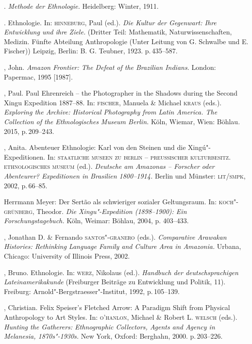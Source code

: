 \begin{bibliohedra}
 \titidem. \textit{Methode der Ethnologie.} Heidelberg:
 Winter, 1911.

 \titidem. Ethnologie. In: \textsc{hinneburg}, Paul (ed.). \textit{Die
 Kultur der Gegenwart: Ihre Entwicklung und ihre Ziele.} (Dritter Teil:
 Mathematik, Naturwissenschaften, Medizin. Fünfte Abteilung
 Anthropologie (Unter Leitung von G. Schwalbe und E. Fischer)) Leipzig,
 Berlin: B. G. Teubner, 1923. p.\,435--587.

 , John. \textit{Amazon Frontier: The Defeat of the Brazilian
 Indians.} London: Papermac, 1995 {[}1987{]}.

 , Paul. Paul Ehrenreich -- the Photographer in the Shadows during
 the Second Xingu Expedition 1887--88. In: \textsc{fischer}, Manuela \& Michael
 \textsc{kraus} (eds.). \textit{Exploring the Archive: Historical Photography from
 Latin America. The Collection of the Ethnologisches Museum Berlin.}
 Köln, Wiemar, Wien: Böhlau. 2015, p.\,209--243.

 , Anita. Abenteuer Ethnologie: Karl von den Steinen und
 die Xingú"-Expeditionen. In: \textsc{staatliche museen zu berlin -- preussischer
 kulturbesitz. ethnologisches museum} (ed.). \textit{Deutsche am Amazonas
 -- Forscher oder Abenteurer? Expeditionen in Brasilien 1800--1914.}
 Berlin und Münster: \textsc{lit/smpk}, 2002, p.\,66--85.

 \titidem Herrmann Meyer: Der Sertão als schwieriger sozialer
 Geltungsraum. In: \textsc{koch"-grünberg}, Theodor. \textit{Die Xingu"-Expedition
 (1898--1900): Ein Forschungstagebuch.} Köln, Weimar: Böhlau, 2004, p.
 403--433.

 , Jonathan D. \& Fernando \textsc{santos"-granero} (eds.). \textit{Comparative
 Arawakan Histories: Rethinking Language Family and Culture Area in
 Amazonia.} Urbana, Chicago: University of Illinois Press, 2002.

 , Bruno. Ethnologie. In: \textsc{werz}, Nikolaus (ed.). \textit{Handbuch
 der deutschsprachigen Lateinamerikakunde} (Freiburger Beiträge zu
 Entwicklung und Politik, 11). Freiburg: Arnold"-Bergstraesser"-Institut,
 1992, p.\,105--139.

 , Christian. Felix Speiser's Fletched Arrow: A Paradigm Shift
 from Physical Anthropology to Art Styles. In: \textsc{o'hanlon}, Michael \&
 Robert L. \textsc{welsch} (eds.). \textit{Hunting the Gatherers: Ethnographic
 Collectors, Agents and Agency in Melanesia, 1870s"-1930s.} New York,
 Oxford: Berghahn, 2000. p.\,203--226.


\end{bibliohedra}
